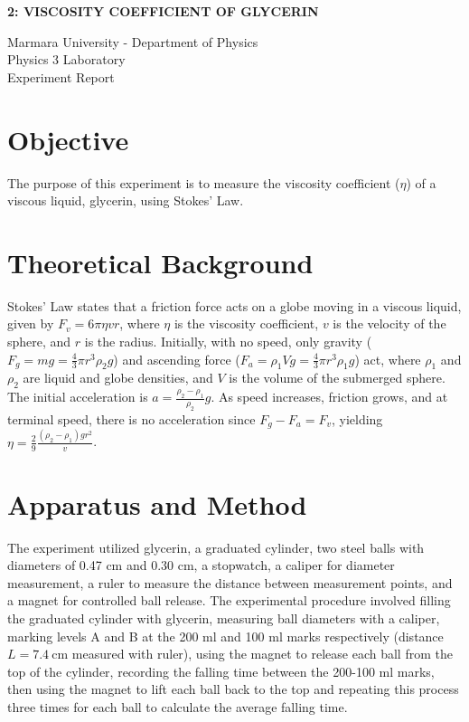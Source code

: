 \documentclass[12pt, a4paper]{article}
\begin{document}
\begin{center}
	\Large \textbf{2: VISCOSITY COEFFICIENT OF GLYCERIN}
	\vspace{0.5cm}
	    
	\normalsize Marmara University - Department of Physics \\
	Physics 3 Laboratory \\
	Experiment Report
	\vspace{0.5cm}
\end{center}

\section{Objective}
The purpose of this experiment is to measure the viscosity coefficient ($\eta$) of a viscous liquid, glycerin, using Stokes' Law.

\section{Theoretical Background}
Stokes' Law states that a friction force acts on a globe moving in a viscous liquid, given by $F_v = 6\pi\eta vr$, where $\eta$ is the viscosity coefficient, $v$ is the velocity of the sphere, and $r$ is the radius. Initially, with no speed, only gravity ($F_g = mg = \frac{4}{3}\pi r^3 \rho_2 g$) and ascending force ($F_a = \rho_1 V g = \frac{4}{3}\pi r^3 \rho_1 g$) act, where $\rho_1$ and $\rho_2$ are liquid and globe densities, and $V$ is the volume of the submerged sphere. The initial acceleration is $a = \frac{\rho_2 - \rho_1}{\rho_2}g$. As speed increases, friction grows, and at terminal speed, there is no acceleration since $F_g - F_a = F_v$, yielding $\eta = \frac{2}{9} \frac{(\rho_2 - \rho_1)g r^2}{v}$.

\section{Apparatus and Method}
The experiment utilized glycerin, a graduated cylinder, two steel balls with diameters of 0.47 cm and 0.30 cm, a stopwatch, a caliper for diameter measurement, a ruler to measure the distance between measurement points, and a magnet for controlled ball release. The experimental procedure involved filling the graduated cylinder with glycerin, measuring ball diameters with a caliper, marking levels A and B at the 200 ml and 100 ml marks respectively (distance $L = \SI{7.4}{\centi\metre}$ measured with ruler), using the magnet to release each ball from the top of the cylinder, recording the falling time between the 200-100 ml marks, then using the magnet to lift each ball back to the top and repeating this process three times for each ball to calculate the average falling time.
\end{document}
